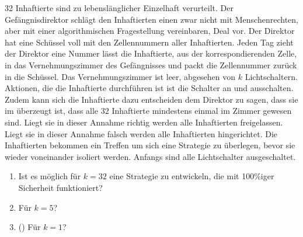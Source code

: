\documentclass{uebung_cs}
\begin{document}
\begin{aufgabe}
	32 Inhaftierte sind zu lebenslänglicher Einzelhaft verurteilt.
	Der Gefängnisdirektor schlägt den Inhaftierten einen zwar nicht mit Menschenrechten, aber mit einer algorithmischen Fragestellung vereinbaren, Deal vor.
	Der Direktor hat eine Schüssel voll mit den Zellennummern aller Inhaftierten.
	Jeden Tag zieht der Direktor eine Nummer lässt die Inhaftierte, aus der korrespondierenden Zelle, in das Vernehmungszimmer des Gefängnisses und packt die Zellennummer zurück in die Schüssel.
	Das Vernehmungszimmer ist leer, abgesehen von $k$ Lichtschaltern.
	Aktionen, die die Inhaftierte durchführen ist ist die Schalter an und ausschalten.
	Zudem kann sich die Inhaftierte dazu entscheiden dem Direktor zu sagen, dass sie im überzeugt ist, dass alle 32 Inhaftierte mindestens einmal im Zimmer gewesen sind.
	Liegt sie in dieser Annahme richtig werden alle Inhaftierten freigelassen.
	Liegt sie in dieser Annahme falsch werden alle Inhaftierten hingerichtet.
	Die Inhaftierten bekommen ein Treffen um sich eine Strategie zu überlegen, bevor sie wieder voneinander isoliert werden.
	Anfangs sind alle Lichtschalter ausgeschaltet.
	\begin{enumerate}
		\item Ist es möglich für $k=32$ eine Strategie zu entwickeln, die mit 100\%iger Sicherheit funktioniert?
		\item Für $k=5$?
		\item (\veryhard) Für $k=1$?
	\end{enumerate}
\end{aufgabe}
\end{document}
